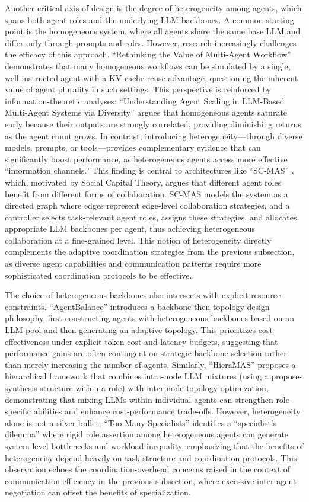 \documentclass[11pt]{article}
\begin{document}
Another critical axis of design is the degree of heterogeneity among agents, which spans both agent roles and the underlying LLM backbones. A common starting point is the homogeneous system, where all agents share the same base LLM and differ only through prompts and roles. However, research increasingly challenges the efficacy of this approach. ``Rethinking the Value of Multi-Agent Workflow'' \cite{ref101} demonstrates that many homogeneous workflows can be simulated by a single, well-instructed agent with a KV cache reuse advantage, questioning the inherent value of agent plurality in such settings. This perspective is reinforced by information-theoretic analyses: ``Understanding Agent Scaling in LLM-Based Multi-Agent Systems via Diversity'' \cite{ref31} argues that homogeneous agents saturate early because their outputs are strongly correlated, providing diminishing returns as the agent count grows. In contrast, introducing heterogeneity---through diverse models, prompts, or tools---provides complementary evidence that can significantly boost performance, as heterogeneous agents access more effective ``information channels.'' This finding is central to architectures like ``SC-MAS'' \cite{ref102}, which, motivated by Social Capital Theory, argues that different agent roles benefit from different forms of collaboration. SC-MAS models the system as a directed graph where edges represent edge-level collaboration strategies, and a controller selects task-relevant agent roles, assigns these strategies, and allocates appropriate LLM backbones per agent, thus achieving heterogeneous collaboration at a fine-grained level. This notion of heterogeneity directly complements the adaptive coordination strategies from the previous subsection, as diverse agent capabilities and communication patterns require more sophisticated coordination protocols to be effective.

The choice of heterogeneous backbones also intersects with explicit resource constraints. ``AgentBalance'' \cite{ref103} introduces a backbone-then-topology design philosophy, first constructing agents with heterogeneous backbones based on an LLM pool and then generating an adaptive topology. This prioritizes cost-effectiveness under explicit token-cost and latency budgets, suggesting that performance gains are often contingent on strategic backbone selection rather than merely increasing the number of agents. Similarly, ``HieraMAS'' \cite{ref52} proposes a hierarchical framework that combines intra-node LLM mixtures (using a propose-synthesis structure within a role) with inter-node topology optimization, demonstrating that mixing LLMs within individual agents can strengthen role-specific abilities and enhance cost-performance trade-offs. However, heterogeneity alone is not a silver bullet; ``Too Many Specialists'' \cite{ref104} identifies a ``specialist's dilemma'' where rigid role assertion among heterogeneous agents can generate system-level bottlenecks and workload inequality, emphasizing that the benefits of heterogeneity depend heavily on task structure and coordination protocols. This observation echoes the coordination-overhead concerns raised in the context of communication efficiency in the previous subsection, where excessive inter-agent negotiation can offset the benefits of specialization.
\end{document}
